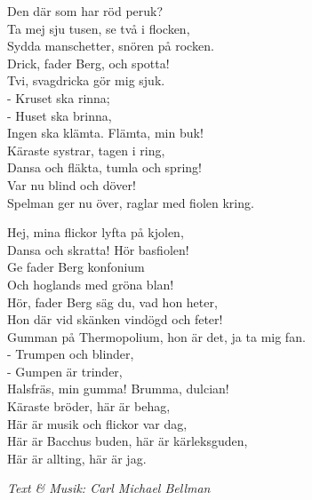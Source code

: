 Den där som har röd peruk?\\
Ta mej sju tusen, se två i flocken,\\
Sydda manschetter, snören på rocken.\\
Drick, fader Berg, och spotta!\\
Tvi, svagdricka gör mig sjuk.\\
- Kruset ska rinna;\\
- Huset ska brinna,\\
Ingen ska klämta. Flämta, min buk!\\
Käraste systrar, tagen i ring,\\
Dansa och fläkta, tumla och spring!\\
Var nu blind och döver!\\
Spelman ger nu över, raglar med fiolen kring.\par
\vspace{10pt}
Hej, mina flickor lyfta på kjolen,\\
Dansa och skratta! Hör basfiolen!\\
Ge fader Berg konfonium\\
Och hoglands med gröna blan!\\
Hör, fader Berg säg du, vad hon heter,\\
Hon där vid skänken vindögd och feter!\\
Gumman på Thermopolium, hon är det, ja ta mig fan.\\
- Trumpen och blinder,\\
- Gumpen är trinder,\\
Halsfräs, min gumma! Brumma, dulcian!\\
Käraste bröder, här är behag,\\
Här är musik och flickor var dag,\\
Här är Bacchus buden, här är kärleksguden,\\
Här är allting, här är jag.\par
\vspace{10pt}
{\footnotesize\textit{Text & Musik: Carl Michael Bellman}}
